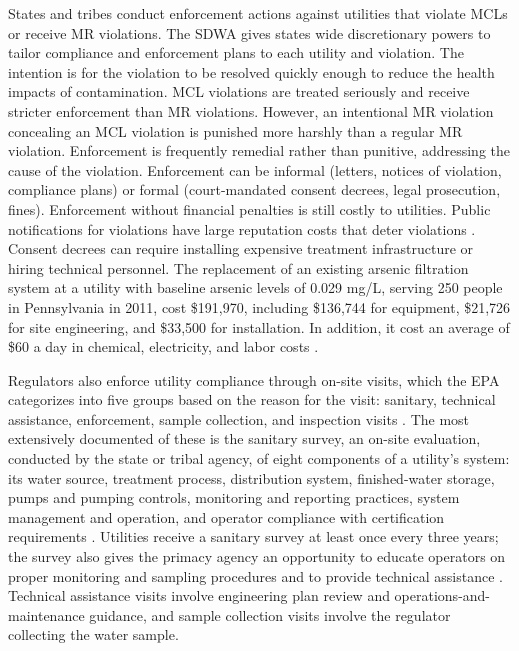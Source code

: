 \documentclass[12pt]{article}
\begin{document}

States and tribes conduct enforcement actions against utilities that violate MCLs or receive MR violations. The SDWA gives states wide discretionary powers to tailor compliance and enforcement plans to each utility and violation. The intention is for the violation to be resolved quickly enough to reduce the health impacts of contamination. MCL violations are treated seriously and receive stricter enforcement than MR violations. However, an intentional MR violation concealing an MCL violation is punished more harshly than a regular MR violation. Enforcement is frequently remedial rather than punitive, addressing the cause of the violation. Enforcement can be informal (letters, notices of violation, compliance plans) or formal (court-mandated consent decrees, legal prosecution, fines). Enforcement without financial penalties is still costly to utilities. Public notifications for violations have large reputation costs that deter violations \parencite{bennear2008impacts}. Consent decrees can require installing expensive treatment infrastructure or hiring technical personnel. The replacement of an existing arsenic filtration system at a utility with baseline arsenic levels of 0.029 mg/L, serving 250 people in Pennsylvania in 2011, cost \$191,970, including \$136,744 for equipment, \$21,726 for site engineering, and \$33,500 for installation. In addition, it cost an average of \$60 a day in chemical, electricity, and labor costs \parencite{epaarsenicbat}.

Regulators also enforce utility compliance through on-site visits, which the EPA categorizes into five groups based on the reason for the visit: sanitary, technical assistance, enforcement, sample collection, and inspection visits \parencite{epaSDWAEchoDownload}. The most extensively documented of these is the sanitary survey, an on-site evaluation, conducted by the state or tribal agency, of eight components of a utility's system: its water source, treatment process, distribution system, finished-water storage, pumps and pumping controls, monitoring and reporting practices, system management and operation, and operator compliance with certification requirements \parencite{epaSanitarySurveys}. Utilities receive a sanitary survey at least once every three years; the survey also gives the primacy agency an opportunity to educate operators on proper monitoring and sampling procedures and to provide technical assistance \parencite{epaSanitarySurveys}. Technical assistance visits involve engineering plan review and operations-and-maintenance guidance, and sample collection visits involve the regulator collecting the water sample.
\end{document}
